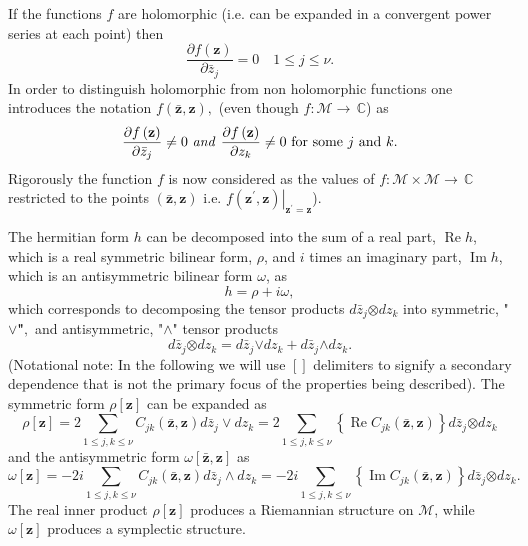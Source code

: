 \documentclass[aps,preprint]{revtex4}%
\begin{document}
If the functions $f$ are holomorphic (i.e. can be expanded in a convergent
power series at each point) then
\begin{equation}
\frac{\partial f\left(  \mathbf{z}\right)  }{\partial\bar{z}_{j}}=0\quad1\leq
j\leq\nu.
\end{equation}
In order to distinguish holomorphic from non holomorphic functions one
introduces the notation $f\left(  \mathbf{\bar{z},z}\right)  ,$ (even though
$f:\mathcal{M\rightarrow\,}\mathbb{C}$) as
\begin{equation}
\frac{\partial f\left(  \mathbf{z}\right)  }{\partial\bar{z}_{j}}\neq0\text{
\emph{and }}\frac{\partial f\left(  \mathbf{z}\right)  }{\partial z_{k}}%
\neq0\text{ for some }j\text{ and }k.
\end{equation}
Rigorously the function $f$ is now considered as the values of $f:\mathcal{M}%
\times\mathcal{M}\rightarrow\mathcal{\,}\mathbb{C}$ restricted to the points
$\left(  \mathbf{\bar{z},z}\right)  $ i.e. $\left.  f\left(  \mathbf{z}%
^{\prime}\mathbf{,z}\right)  \right\vert _{\mathbf{z}^{\prime}=\mathbf{z}}$).

The hermitian form $h$ can be decomposed into the sum of a real part,
$\operatorname{Re}h$, which is a real symmetric bilinear form, $\rho$, and $i$
times an imaginary part, $\operatorname{Im}h$, which is an antisymmetric
bilinear form $\omega$, as
\begin{equation}
h=\rho+i\omega,
\end{equation}
which corresponds to decomposing the tensor products $d\bar{z}_{j}%
\mathbf{\otimes}dz_{k}$ into symmetric, "$\mathbf{\vee}$\textbf{"}$\mathbf{,}$
and antisymmetric, "$\mathbf{\wedge}$" tensor products \cite{Greub}%
\begin{equation}
d\bar{z}_{j}\mathbf{\otimes}dz_{k}=d\bar{z}_{j}\mathbf{\vee}dz_{k}+d\bar
{z}_{j}\mathbf{\wedge}dz_{k}.
\end{equation}
(Notational note: In the following we will use $\left[  {}\right]  $
delimiters to signify a secondary dependence that is not the primary focus of
the properties being described). The symmetric form $\rho\left[
\mathbf{z}\right]  $ can be expanded as%
\begin{equation}
\rho\left[  \mathbf{z}\right]  =2\sum_{1\leq j,k\leq\nu}C_{jk}\left(
\mathbf{\bar{z},z}\right)  d\bar{z}_{j}\vee dz_{k}=2\sum_{1\leq j,k\leq\nu
}\left\{  \operatorname{Re}C_{jk}\left(  \mathbf{\bar{z},z}\right)  \right\}
d\bar{z}_{j}\mathbf{\otimes}dz_{k}%
\end{equation}
and the antisymmetric form $\omega\left[  \mathbf{\bar{z},z}\right]  $ as
\begin{equation}
\omega\left[  \mathbf{z}\right]  =-2i\sum_{1\leq j,k\leq\nu}C_{jk}\left(
\mathbf{\bar{z},z}\right)  d\bar{z}_{j}\wedge dz_{k}=-2i\sum_{1\leq j,k\leq
\nu}\left\{  \operatorname{Im}C_{jk}\left(  \mathbf{\bar{z},z}\right)
\right\}  d\bar{z}_{j}\mathbf{\otimes}dz_{k}.
\end{equation}
The real inner product $\rho\left[  \mathbf{z}\right]  $ produces a Riemannian
structure on $\mathcal{M}$, while $\omega\left[  \mathbf{z}\right]  $ produces
a symplectic structure.
\end{document}
